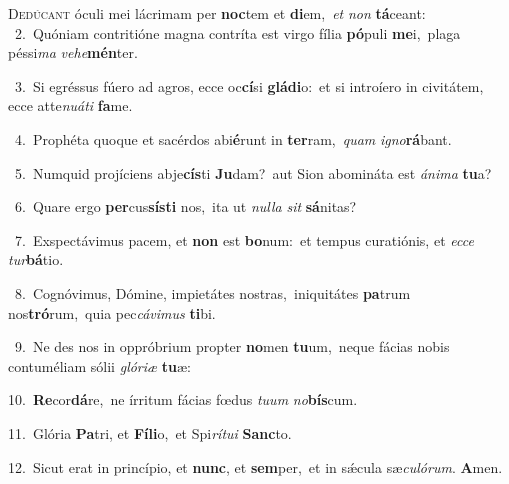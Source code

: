 \lettrine{\initial\textcolor{\initialcolor}{D}}{edúcant} óculi mei lácrimam per \textbf{noc}\-tem et \textbf{di}\-em,~\star \textit{et} \textit{non} \textbf{tá}\-ceant:\\
{\numbfont\textcolor{\numbcolor}{~2.}}~Quóniam contritióne magna contríta est virgo fília \textbf{pó}\-puli \textbf{me}\-i,~\star plaga péssi\textit{ma} \textit{ve}\-\textit{he}\textbf{mén}ter.\par
{\numbfont\textcolor{\numbcolor}{~3.}}~Si egréssus fúero ad agros, ecce oc\-\textbf{cí}\-si \textbf{glá}\-\textbf{di}o:~\star et si introíero in civitátem, ecce atte\-\textit{nu}\-\textit{á}\textit{ti} \textbf{fa}\-me.\par
{\numbfont\textcolor{\numbcolor}{~4.}}~Prophéta quoque et sacérdos abi\-\textbf{é}\-runt in \textbf{ter}\-ram,~\star \textit{quam} \textit{i}\-\textit{gno}\textbf{rá}bant.\par
{\numbfont\textcolor{\numbcolor}{~5.}}~Numquid projíciens abje\-\textbf{cís}\-ti \textbf{Ju}\-dam?~\star aut Sion abomináta est \textit{á}\-\textit{ni}\textit{ma} \textbf{tu}\-a?\par
{\numbfont\textcolor{\numbcolor}{~6.}}~Quare ergo \textbf{per}\-cus\-\textbf{sís}\-\textbf{ti} nos,~\star ita ut \textit{nul}\-\textit{la} \textit{sit} \textbf{sá}\-nitas?\par
{\numbfont\textcolor{\numbcolor}{~7.}}~Exspectávimus pacem, et \textbf{non} est \textbf{bo}\-num:~\star et tempus curatiónis, et \textit{ec}\-\textit{ce} \textit{tur}\-\textbf{bá}tio.\par
{\numbfont\textcolor{\numbcolor}{~8.}}~Cognóvimus, Dómine, impietátes nostras,~\dagger iniquitátes \textbf{pa}\-trum nos\-\textbf{tró}\-rum,~\star quia pec\-\textit{cá}\-\textit{vi}\textit{mus} \textbf{ti}\-bi.\par
{\numbfont\textcolor{\numbcolor}{~9.}}~Ne des nos in oppróbrium propter \textbf{no}\-men \textbf{tu}\-um,~\star neque fácias nobis contuméliam sólii \textit{gló}\-\textit{ri}\textit{æ} \textbf{tu}\-æ:\par
{\numbfont\textcolor{\numbcolor}{10.}}~\-\textbf{Re}\-cor\-\textbf{dá}\-re,~\star ne írritum fácias fœdus \textit{tu}\-\textit{um} \textit{no}\-\textbf{bís}cum.\par
{\numbfont\textcolor{\numbcolor}{11.}}~Glória \textbf{Pa}\-tri, et \textbf{Fí}\-\textbf{li}o,~\star et Spi\-\textit{rí}\-\textit{tu}\textit{i} \textbf{Sanc}\-to.\par
{\numbfont\textcolor{\numbcolor}{12.}}~Sicut erat in princípio, et \textbf{nunc}\-, et \textbf{sem}\-per,~\star et in sǽcula sæ\-\textit{cu}\-\textit{ló}\textit{rum}. \textbf{A}\-men.\par
